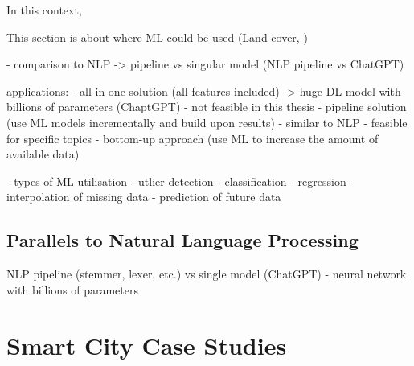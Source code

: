 In this context, 

This section is about where ML could be used (Land cover, )

- comparison to NLP -> pipeline vs singular model (NLP pipeline vs ChatGPT)

applications:
- all-in one solution (all features included) -> huge DL model with billions of parameters (ChaptGPT)
    - not feasible in this thesis
- pipeline solution (use ML models incrementally and build upon results)
    - similar to NLP
    - feasible for specific topics
    - bottom-up approach (use ML to increase the amount of available data)

- types of ML utilisation
    - utlier detection
    - classification
    - regression
        - interpolation of missing data
        - prediction of future data

\subsection{Parallels to Natural Language Processing}

NLP pipeline (stemmer, lexer, etc.)
vs single model (ChatGPT) - neural network with billions of parameters



\section{Smart City Case Studies}
\label{sec: smart city case studies}

